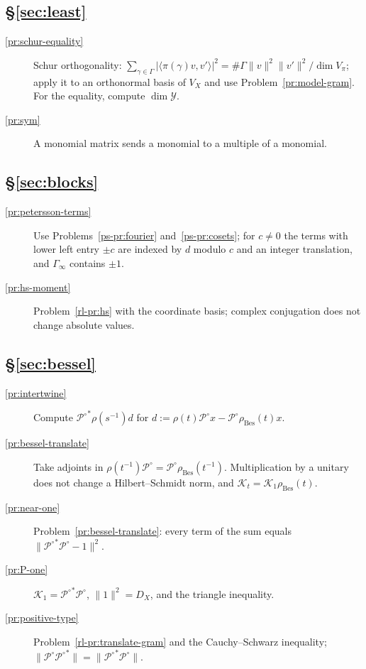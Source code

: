 \documentclass[reqno]{amsart}
\theoremstyle{definition}
\theoremstyle{plain}
\theoremstyle{remark}
\newcommand{\Yc}{\mathcal Y}
\newcommand{\Kc}{\mathcal K}
\newcommand{\Po}{{\mathcal P^\circ}}
\newcommand{\rB}{\rho_{\mathrm{Bes}}}
\begin{document}
\subsection*{\S\ref{sec:least}}
\begin{description}
\item[\ref{pr:schur-equality}] Schur orthogonality: \(\sum_{\gamma\in\Gamma}\lvert\langle\pi(\gamma)v,v'\rangle\rvert^2=\#\Gamma\lVert v\rVert^2\lVert v'\rVert^2/\dim V_\pi\); apply it to an orthonormal basis of \(V_X\) and use Problem~\ref{pr:model-gram}.  For the equality, compute \(\dim\Yc\).
\item[\ref{pr:sym}] A monomial matrix sends a monomial to a multiple of a monomial.
\end{description}

\subsection*{\S\ref{sec:blocks}}
\begin{description}
\item[\ref{pr:petersson-terms}] Use Problems~\ref{ps-pr:fourier} and~\ref{ps-pr:cosets}; for \(c\ne0\) the terms with lower left entry \(\pm c\) are indexed by \(d\) modulo \(c\) and an integer translation, and \(\Gamma_\infty\) contains \(\pm1\).
\item[\ref{pr:hs-moment}] Problem~\ref{rl-pr:hs} with the coordinate basis; complex conjugation does not change absolute values.
\end{description}

\subsection*{\S\ref{sec:bessel}}
\begin{description}
\item[\ref{pr:intertwine}] Compute \(\Po^*\rho(s^{-1})d\) for \(d:=\rho(t)\Po x-\Po\rB(t)x\).
\item[\ref{pr:bessel-translate}] Take adjoints in \(\rho(t^{-1})\Po=\Po\rB(t^{-1})\).  Multiplication by a unitary does not change a Hilbert--Schmidt norm, and \(\Kc_t=\Kc_1\rB(t)\).
\item[\ref{pr:near-one}] Problem~\ref{pr:bessel-translate}: every term of the sum equals \(\lVert\Po^*\Po-1\rVert^2\).
\item[\ref{pr:P-one}] \(\Kc_1=\Po^*\Po\), \(\lVert1\rVert^2=D_X\), and the triangle inequality.
\item[\ref{pr:positive-type}] Problem~\ref{rl-pr:translate-gram} and the Cauchy--Schwarz inequality; \(\lVert\Po\Po^*\rVert=\lVert\Po^*\Po\rVert\).
\end{description}
\end{document}
